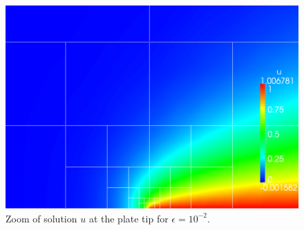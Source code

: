 \documentclass[letterpaper]{article}
\begin{document}
\begin{figure}[!h]
\centering
\includegraphics[scale=.3]{figs/LaplaceFigs/coupled1e2h1e3uZoom.png}
\caption{Zoom of solution $u$ at the plate tip for $\epsilon = 10^{-2}$.}
\label{fig:newNormZoom}
\end{figure}
\end{document}
